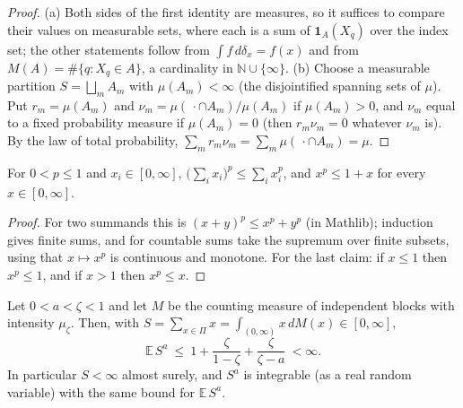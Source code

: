 \begin{proof}
  \leanok
(a) Both sides of the first identity are measures, so it suffices to compare their values on measurable sets, where each is a sum of $\mathbf 1_A(X_q)$ over the index set; the other statements follow from $\int f\,d\delta_x=f(x)$ and from $M(A)=\#\{q:X_q\in A\}$, a cardinality in $\mathbb N\cup\{\infty\}$. (b) Choose a measurable partition $S=\bigsqcup_mA_m$ with $\mu(A_m)<\infty$ (the disjointified spanning sets of $\mu$). Put $r_m=\mu(A_m)$ and $\nu_m=\mu(\,\cdot\cap A_m)/\mu(A_m)$ if $\mu(A_m)>0$, and $\nu_m$ equal to a fixed probability measure if $\mu(A_m)=0$ (then $r_m\nu_m=0$ whatever $\nu_m$ is). By the law of total probability, $\sum_mr_m\nu_m=\sum_m\mu(\,\cdot\cap A_m)=\mu$.
\end{proof}

\begin{lemma}\label{lem:sg:pd-rpow}
  \leanok
For $0<p\le1$ and $x_i\in[0,\infty]$, $\big(\sum_ix_i\big)^p\le\sum_ix_i^p$, and $x^p\le1+x$ for every $x\in[0,\infty]$.
\end{lemma}

\begin{proof}
  \leanok
For two summands this is $(x+y)^p\le x^p+y^p$ (in Mathlib); induction gives finite sums, and for countable sums take the supremum over finite subsets, using that $x\mapsto x^p$ is continuous and monotone. For the last claim: if $x\le1$ then $x^p\le1$, and if $x>1$ then $x^p\le x$.
\end{proof}

\begin{theorem}\label{thm:sg:pd-moment}
  \leanok
Let $0<a<\zeta<1$ and let $M$ be the counting measure of independent blocks with intensity $\mu_\zeta$. Then, with $S=\sum_{x\in\Pi}x=\int_{(0,\infty)}x\,dM(x)\in[0,\infty]$,
\[\mathbb E\,S^a\ \le\ 1+\frac{\zeta}{1-\zeta}+\frac{\zeta}{\zeta-a}\ <\infty .\]
In particular $S<\infty$ almost surely, and $S^a$ is integrable (as a real random variable) with the same bound for $\mathbb E\,S^a$.
\end{theorem}

